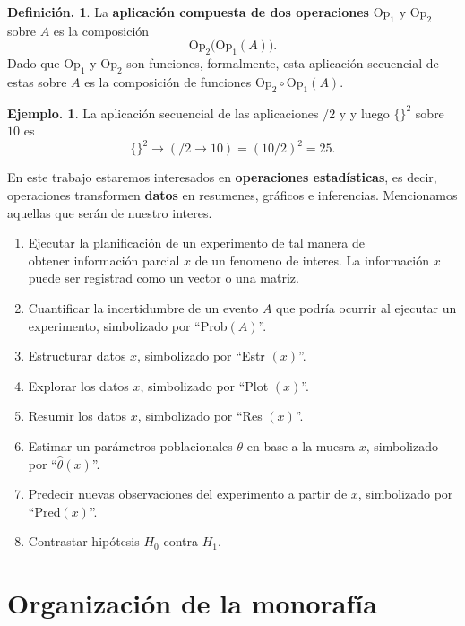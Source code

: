 \documentclass[]{book}
\theoremstyle{definition}
\newtheorem{definition}{Definición.}[chapter]
\theoremstyle{definition}
\newtheorem{example}{Ejemplo.}[chapter]
\theoremstyle{definition}
\theoremstyle{remark}
\begin{document}
\begin{definition}
\protect\hypertarget{def:unnamed-chunk-3}{}{\label{def:unnamed-chunk-3} }La \textbf{aplicación compuesta de dos operaciones} \(\mbox{Op}_1\) y
\(\mbox{Op}_2\) sobre \(A\) es la composición
\[ \mbox{Op}_2 \big(\mbox{Op}_1 (A)\big). 
  \]
Dado que \(\mbox{Op}_1\) y \(\mbox{Op}_2\) son funciones, formalmente,
esta aplicación secuencial de estas sobre \(A\) es la composición de
funciones \(\mbox{Op}_2 \circ \mbox{Op}_1(A)\).
\end{definition}

\begin{example}
\protect\hypertarget{exm:unnamed-chunk-4}{}{\label{exm:unnamed-chunk-4} }La aplicación secuencial de las aplicaciones \(/2\) y y luego
\(\{\}^2\) sobre \(10\) es
\[ \{\}^2 \rightarrow ( /2 \rightarrow 10)= (10/2)^2= 25.  \]
\end{example}

En este trabajo estaremos interesados en \textbf{operaciones
estadísticas}, es decir, operaciones transformen \textbf{datos} en
resumenes, gráficos e inferencias. Mencionamos aquellas que serán
de nuestro interes.

\begin{enumerate}
\def\labelenumi{\arabic{enumi}.}
\item
  Ejecutar la planificación de un experimento de tal manera de\\
  obtener información parcial \(x\) de un fenomeno de interes. La
  información \(x\) puede ser registrad como un vector o una matriz.
\item
  Cuantificar la incertidumbre de un evento \(A\) que podría
  ocurrir al ejecutar un experimento, simbolizado por ``Prob\((A)\)''.
\item
  Estructurar datos \(x\), simbolizado por ``Estr \((x)\)''.
\item
  Explorar los datos \(x\), simbolizado por ``Plot \((x)\)''.
\item
  Resumir los datos \(x\), simbolizado por ``Res \((x)\)''.
\item
  Estimar un parámetros poblacionales \(\theta\) en base a la
  muesra \(x\), simbolizado por ``\(\widehat{\theta}(x)\)''.
\item
  Predecir nuevas observaciones del experimento a partir de \(x\),
  simbolizado por ``Pred\((x)\)''.
\item
  Contrastar hipótesis \(H_0\) contra \(H_1\).
\end{enumerate}

\hypertarget{organizaciuxf3n-de-la-monorafuxeda}{%
\section*{Organización de la monorafía}\label{organizaciuxf3n-de-la-monorafuxeda}}
\end{document}
